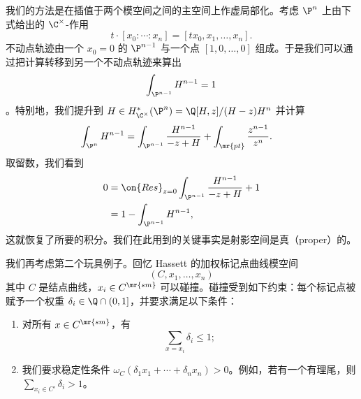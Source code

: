 我们的方法是在插值于两个模空间之间的主空间上作虚局部化。考虑 \(\P^n\) 上由下式给出的 \(\C^{\times}\)-作用
\[ t \cdot [x_0 : \cdots : x_n] = [t x_0, x_1, \ldots, x_n]. \]
不动点轨迹由一个 \(x_0 = 0\) 的 \(\P^{n-1}\) 与一个点 \([1, 0, \ldots, 0]\) 组成。于是我们可以通过把计算转移到另一个不动点轨迹来算出
\[ \int_{\P^{n-1}} H^{n-1} = 1 \]
。特别地，我们提升到 \(H \in H_{\C^{\times}}^* (\P^n) = \Q[H,z] / (H-z)H^n\) 并计算
\begin{align*}
    \int_{\P^n} H^{n-1} &= \int_{\P^{n-1}} \frac{H^{n-1}}{-z+H} + \int_{\mr{pt}} \frac{z^{n-1}}{z^n}.
\end{align*}
取留数，我们看到
\begin{align*}
    0 &= \on{Res}_{z = 0}\int_{\P^{n-1}} \frac{H^{n-1}}{-z+H} + 1 \\
    &= 1 - \int_{\P^{n-1}}H^{n-1},
\end{align*}
这就恢复了所要的积分。我们在此用到的关键事实是射影空间是真（proper）的。

\begin{exm}[第二个玩具例子]
    我们再考虑第二个玩具例子。回忆 Hassett 的加权标记点曲线模空间
    \[ (C, x_1, \ldots, x_n) \]
    其中 \(C\) 是结点曲线，\(x_i \in C^{\mr{sm}}\) 可以碰撞。碰撞受到如下约束：每个标记点被赋予一个权重 \(\delta_i \in \Q \cap (0,1]\)，并要求满足以下条件：
    \begin{enumerate}
        \item 对所有 \(x \in C^{\mr{sm}}\)，有
            \[ \sum_{x = x_i} \delta_i \leq 1; \]
        \item 我们要求稳定性条件 \(\omega_C(\delta_1 x_1 + \cdots + \delta_n x_n) > 0\)。例如，若有一个有理尾，则 \(\sum_{x_i \in C'} \delta_i > 1\)。
    \end{enumerate}
\end{exm}

